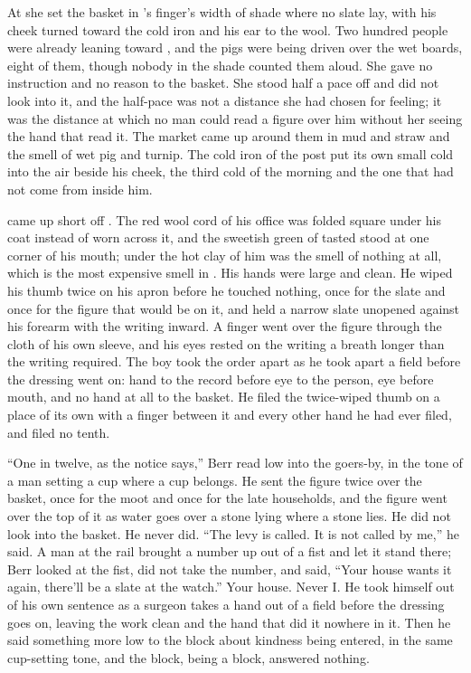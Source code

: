 At  she set the basket in 's finger's width of shade where no slate lay, with his cheek turned toward the cold iron and his ear to the wool. Two hundred people were already leaning toward , and the pigs were being driven over the wet boards, eight of them, though nobody in the shade counted them aloud. She gave no instruction and no reason to the basket. She stood half a pace off and did not look into it, and the half-pace was not a distance she had chosen for feeling; it was the distance at which no man could read a figure over him without her seeing the hand that read it. The market came up around them in mud and straw and the smell of wet pig and turnip. The cold iron of the post put its own small cold into the air beside his cheek, the third cold of the morning and the one that had not come from inside him.

 came up short off . The red wool cord of his office was folded square under his coat instead of worn across it, and the sweetish green of tasted  stood at one corner of his mouth; under the hot clay of him was the smell of nothing at all, which is the most expensive smell in . His hands were large and clean. He wiped his thumb twice on his apron before he touched nothing, once for the slate and once for the figure that would be on it, and held a narrow slate unopened against his forearm with the writing inward. A finger went over the figure through the cloth of his own sleeve, and his eyes rested on the writing a breath longer than the writing required. The boy took the order apart as he took apart a field before the dressing went on: hand to the record before eye to the person, eye before mouth, and no hand at all to the basket. He filed the twice-wiped thumb on a place of its own with a finger between it and every other hand he had ever filed, and filed no tenth.

“One in twelve, as the notice says,” Berr read low into the goers-by, in the tone of a man setting a cup where a cup belongs. He sent the figure twice over the basket, once for the moot and once for the late households, and the figure went over the top of it as water goes over a stone lying where a stone lies. He did not look into the basket. He never did. “The levy is called. It is not called by me,” he said. A man at the rail brought a number up out of a fist and let it stand there; Berr looked at the fist, did not take the number, and said, “Your house wants it again, there'll be a slate at the watch.” Your house. Never I. He took himself out of his own sentence as a surgeon takes a hand out of a field before the dressing goes on, leaving the work clean and the hand that did it nowhere in it. Then he said something more low to the block about kindness being entered, in the same cup-setting tone, and the block, being a block, answered nothing.

